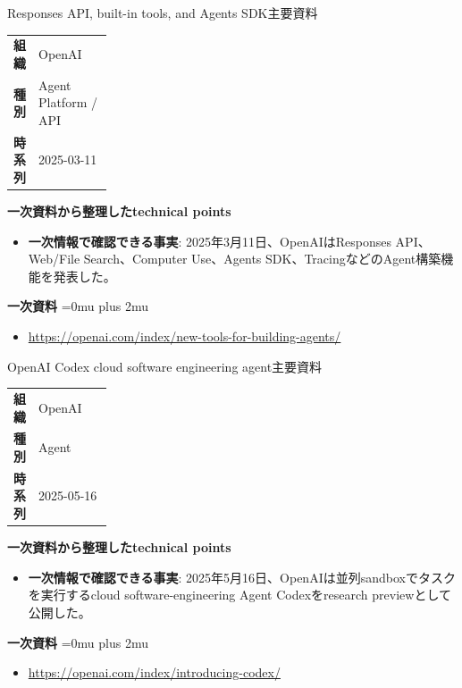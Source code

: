 \begin{technicalnote}{Responses API, built-in tools, and Agents SDK}{主要資料}
\begingroup
\begin{tabularx}{\linewidth}{@{}>{\bfseries}p{0.22\linewidth}X@{}}
組織 & OpenAI \\
種別 & Agent Platform / API \\
時系列 & 2025-03-11 \\
\end{tabularx}
\smallskip
{\bfseries 一次資料から整理したtechnical points}
\begin{itemize}[leftmargin=1.5em,itemsep=0.35em]
\item \textbf{一次情報で確認できる事実}: 2025年3月11日、OpenAIはResponses API、Web/File Search、Computer Use、Agents SDK、TracingなどのAgent構築機能を発表した。
\end{itemize}
\begin{samepage}
{\bfseries 一次資料}
\begingroup\sloppy
\Urlmuskip=0mu plus 2mu\relax
\begin{itemize}[leftmargin=1.5em,itemsep=0.25em]
\item {\scriptsize\url{https://openai.com/index/new-tools-for-building-agents/}}
\end{itemize}
\endgroup
\end{samepage}
\endgroup
\end{technicalnote}
\medskip

\begin{technicalnote}{OpenAI Codex cloud software engineering agent}{主要資料}
\begingroup
\begin{tabularx}{\linewidth}{@{}>{\bfseries}p{0.22\linewidth}X@{}}
組織 & OpenAI \\
種別 & Agent \\
時系列 & 2025-05-16 \\
\end{tabularx}
\smallskip
{\bfseries 一次資料から整理したtechnical points}
\begin{itemize}[leftmargin=1.5em,itemsep=0.35em]
\item \textbf{一次情報で確認できる事実}: 2025年5月16日、OpenAIは並列sandboxでタスクを実行するcloud software-engineering Agent Codexをresearch previewとして公開した。
\end{itemize}
\begin{samepage}
{\bfseries 一次資料}
\begingroup\sloppy
\Urlmuskip=0mu plus 2mu\relax
\begin{itemize}[leftmargin=1.5em,itemsep=0.25em]
\item {\scriptsize\url{https://openai.com/index/introducing-codex/}}
\end{itemize}
\endgroup
\end{samepage}
\endgroup
\end{technicalnote}
\medskip

